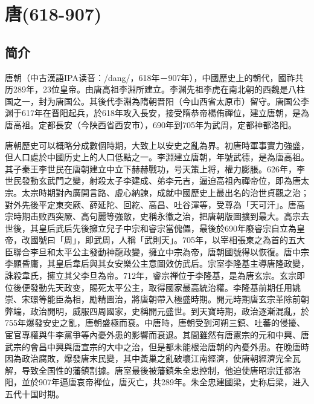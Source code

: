
\chapter{唐\tiny(618-907)}

\section{简介}

唐朝（中古漢語IPA读音：/dang/，618年－907年），中國歷史上的朝代，國祚共历289年，23位皇帝。由唐高祖李淵所建立。李渊先祖李虎在南北朝的西魏是八柱国之一，封为唐国公。其後代李淵為隋朝晋阳（今山西省太原市）留守。唐国公李渊于617年在晋阳起兵，於618年攻入長安，接受隋恭帝楊侑禪位，建立唐朝，是為唐高祖。定都長安（今陕西省西安市），690年到705年为武周，定都神都洛阳。

唐朝歷史可以概略分成數個時期，大致上以安史之亂為界。初唐時軍事實力強盛，但人口處於中國历史上的人口低點之一。李淵建立唐朝，年號武德，是為唐高祖。其子秦王李世民在唐朝建立中立下赫赫戰功，号天策上将，權力膨脹。626年，李世民發動玄武門之變，射殺太子李建成、弟李元吉，逼迫高祖內禪帝位，即為唐太宗。太宗時期對內廣開言路、虛心納諫，成就中國歷史上最出名的治世貞觀之治；對外先後平定東突厥、薛延陀、回紇、高昌、吐谷渾等，受尊為「天可汗」。唐高宗時期击败西突厥、高句麗等強敵，史稱永徽之治，把唐朝版圖擴到最大。高宗去世後，其皇后武后先後擁立兒子中宗和睿宗當傀儡，最後於690年廢睿宗自立為皇帝，改國號曰「周」，即武周，人稱「武則天」。705年，以宰相張柬之為首的五大臣聯合李旦和太平公主發動神龍政變，擁立中宗為帝，唐朝國號得以恢復。唐中宗李顯昏庸，其皇后韋后與其女安樂公主意圖效仿武后。宗室李隆基主導唐隆政變，誅殺韋氏，擁立其父李旦為帝。712年，睿宗禅位于李隆基，是為唐玄宗。玄宗即位後便發動先天政变，賜死太平公主，取得國家最高統治權。李隆基前期任用姚崇、宋璟等能臣為相，勵精圖治，將唐朝帶入極盛時期。開元時期唐玄宗革除前朝弊端，政治開明，威服四周國家，史稱開元盛世。到天寶時期，政治逐漸混亂，於755年爆發安史之亂，唐朝盛極而衰。中唐時，唐朝受到河朔三鎮、吐蕃的侵擾、宦官專權與牛李黨爭等內憂外患的影響而衰退。其間雖然有唐憲宗的元和中興、唐武宗的會昌中興與唐宣宗的大中之治，但是都未能根治唐朝的內憂外患。在晚唐時因為政治腐敗，爆發唐末民變，其中黃巢之亂破壞江南經濟，使唐朝經濟完全瓦解，导致全国性的藩鎮割據。唐室最後被藩鎮朱全忠控制，他迫使唐昭宗迁都洛阳，並於907年逼唐哀帝禅位，唐灭亡，共289年。朱全忠建國梁，史称后梁，进入五代十国时期。

